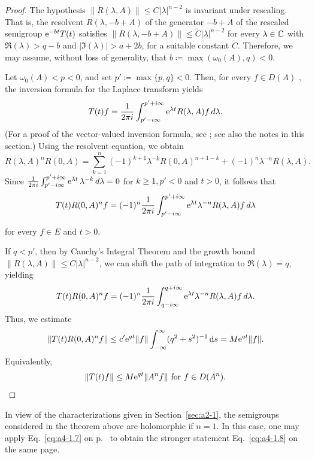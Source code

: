 \begin{proof} 
The hypothesis $\| R(\lambda, A) \| \leq C | \lambda |^{n-2}$ is invariant under rescaling. 
That is, the resolvent $R(\lambda, -b+A)$ of the generator $-b+A$ of the rescaled semigroup $\mathrm{e}^{-bt} T(t)$ satisfies
$\| R(\lambda, -b+A) \| \leq \tilde{C} | \lambda |^{n-2}$ for every $\lambda \in \mathbb{C}$ with $\Re(\lambda) > q-b$ and $| \Im(\lambda) | > a+2b$, for a suitable constant $\tilde{C}$. 
Therefore, we may assume, without loss of generality, that $b \coloneq  \max(\omega_{0}(A), q) < 0$. 

Let $\omega_{0}(A) < p < 0$, and set $p' \coloneq  \max\{p, q\} < 0$. 
Then, for every $f \in D(A)$ , the inversion formula for the Laplace transform yields 
\begin{equation} \label{eq:a4-1.12}
T(t) f = \frac{1}{2\pi i} \int_{p' - i\infty}^{p' + i\infty} \mathrm{e}^{\lambda t} R(\lambda, A) f \, d\lambda.
\end{equation}
 (For a proof of the vector-valued inversion formula, see \textcite[p.66]{widder:1946}; see also the notes in this section.)
Using the resolvent equation, we obtain 
\[ 
R(\lambda, A)^n R(0, A) = \sum_{k=1}^{n} (-1)^{k+1} \lambda^{-k} R(0, A)^{n+1-k} + (-1)^n \lambda^{-n} R(\lambda, A).
\]
Since 
$ \frac {1}{2\pi i} \int_{p' - i\infty}^{p' + i\infty} \mathrm{e}^{\lambda t} \, \lambda^{-k} \, d\lambda = 0 $ for $ k \geq 1, p' < 0 $ and $ t > 0$, it follows that
 \begin{equation}\label{eq:a4-1.13}
   T(t) R(0, A)^n f = (-1)^n \frac{1}{2\pi i} \int_{p' - i\infty}^{p' + i\infty} \mathrm{e}^{\lambda t} \lambda^{-n} R(\lambda, A) f \, d\lambda
    \end{equation}
    
 for every $f \in E$ and $t > 0$.
    
 If\/ $q < p'$, then by Cauchy's Integral Theorem and the growth bound $\| R(\lambda, A) \| \leq C | \lambda |^{n-2}$, we can shift the path of integration to 
 $\Re(\lambda) = q$, yielding
\[
    T(t) R(0, A)^n f = (-1)^n \frac{1}{2\pi i} \int_{q - i\infty}^{q + i\infty} \mathrm{e}^{\lambda t} \lambda^{-n} R(\lambda, A) f \, d\lambda.
\]
Thus, we estimate  
\[
\| T(t) R(0,A)^n f \| \leq c' \eu^{q t} \| f \| \int_{-\infty}^{\infty} (q^2 + s^2)^{-1}\ds = M \eu^{q t} \| f \|.
\]
Equivalently,
\begin{equation*}
\| T(t) f \| \leq M \eu^{q t} \| A^n f \| \text{ for $f \in D(A^n)$.}
\qedhere
\end{equation*}
\end{proof}
In view of the characterizations given in Section~\ref{sec:a2-1},  the semigroups considered in the theorem above are holomorphic if\/ $ n = 1 $. 
In this case, one may apply Eq.~\eqref{eq:a4-1.7} on p.~\pageref{eq:a4-1.7} to obtain the stronger statement Eq.~\eqref{eq:a4-1.8}
on the same page.%

